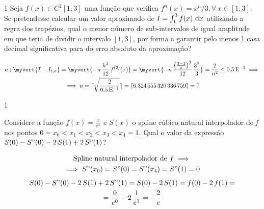 \documentclass[CN_A-Tests_Resolutions.tex]{subfiles}
\begin{document}
\begin{questionBox}1{} %
  Seja \(f(x)\in C^2{[1,3]}\) uma função que verifica \(f^{n}(x) = x^n/3, \forall\,x\in {[1,3]}\). Se pretendesse calcular um valor aproximado de \(I= \int_1^3{f(x)\,\odif{x}}\) utilizando a regra dos trapézios, qual o menor número de sub-intervalos de igual amplitude em que teria de dividir o intervalo \([1,3]\), por forma a garantir pelo menos 1 casa decimal significativa para do erro absoluto da aproximação?


  \begin{gather*}
    n:
    \myvert{I-I_{t,n}}
    = \myvert{-n\,\frac{h^3}{12}\,f^{(2)}(x)}
    = \myvert{
      -n
      \,\frac{\left(
          \frac{3-1}{n}
      \right)^3}{12}
      \,\frac{3^2}{3}
    }
    = \frac{2}{n^2}
    \leq 0.5\E{-1}
    \implies \\
    \implies
    n
    =\ceil{\sqrt{\frac{2}{0.5\E{-1}}}}
    =\ceil{\num{6.324555320336759}}
    =7
  \end{gather*}

\end{questionBox}

\begin{questionBox}1{} %

  Considere a função \(f(x)=\frac{x}{e^x}\text{ e }S(x)\) o spline cúbico natural interpolador de \textit{f} nos pontos \(0=x_0<x_1<x_2<x_3<x_4=1\). Qual o valor da expressão \(S(0)-S"(0)-2\,S(1)+2\,S"(1)\)?

  \answer{}

  \begin{gather*}
    \text{Spline natural interpolador de } f
    \implies \\
    \implies
    S"(x_0)=S"(0)=S"(x_4)=S"(1)=0
    \\[1ex]
    S(0)-S"(0)-2\,S(1)+2\,S"(1)
    = S(0)-2\,S(1)
    = f(0)-2\,f(1)
    = \\
    = \frac{0}{e^0}
    - 2\,\frac{1}{e^1}
    = -\frac{2}{e}
  \end{gather*}

\end{questionBox}
\end{document}
